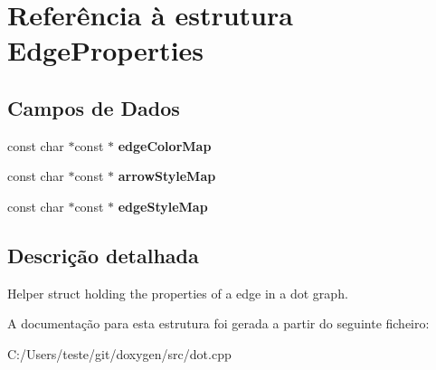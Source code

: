 \hypertarget{struct_edge_properties}{\section{Referência à estrutura Edge\-Properties}
\label{struct_edge_properties}
}
\subsection*{Campos de Dados}
\begin{DoxyCompactItemize}
\item 
\hypertarget{struct_edge_properties_aad338634d07e883452400e5f9d35b6c2}{const char $\ast$const $\ast$ {\bfseries edge\-Color\-Map}}\label{struct_edge_properties_aad338634d07e883452400e5f9d35b6c2}

\item 
\hypertarget{struct_edge_properties_a4d9fa5e52496d22fdafb1a7b8103e0f1}{const char $\ast$const $\ast$ {\bfseries arrow\-Style\-Map}}\label{struct_edge_properties_a4d9fa5e52496d22fdafb1a7b8103e0f1}

\item 
\hypertarget{struct_edge_properties_aea58b14939298c6f66403492a548ead2}{const char $\ast$const $\ast$ {\bfseries edge\-Style\-Map}}\label{struct_edge_properties_aea58b14939298c6f66403492a548ead2}

\end{DoxyCompactItemize}


\subsection{Descrição detalhada}
Helper struct holding the properties of a edge in a dot graph. 

A documentação para esta estrutura foi gerada a partir do seguinte ficheiro\-:\begin{DoxyCompactItemize}
\item 
C\-:/\-Users/teste/git/doxygen/src/dot.\-cpp\end{DoxyCompactItemize}
